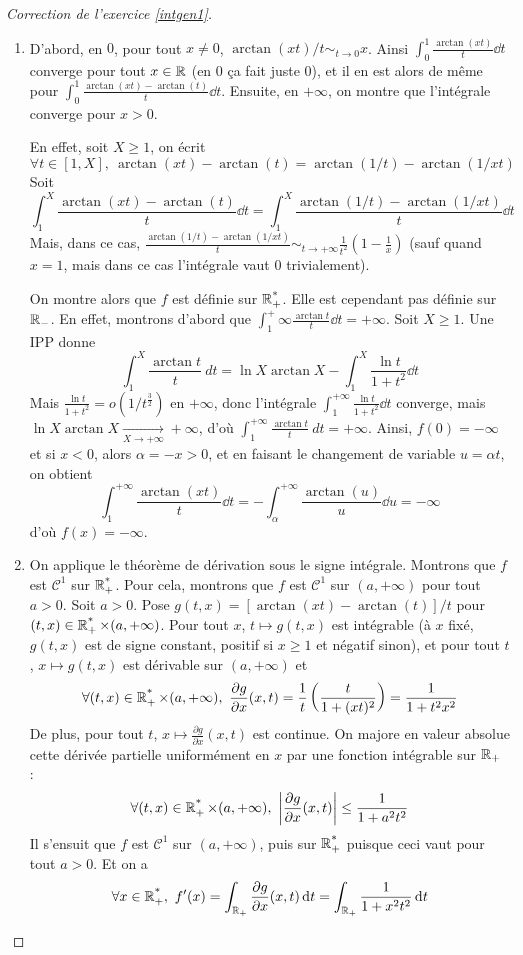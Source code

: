 \begin{proof}[Correction de l'exercice \ref{intgen1}]
	\begin{enumerate}
		\item D'abord, en $0$, pour tout $x\neq 0$, $\arctan(xt)/t\sim_{t\to 0} x$. 
		Ainsi $\int_0^1\frac{\arctan(xt)}t\dd t$ converge pour tout $x\in\operatorname{\mathbb R}$ (en $0$ ça fait juste $0$),
		et il en est alors de même pour $\int_0^1\frac{\arctan(xt)-\arctan(t)}t\dd t$.
		Ensuite, en $+\infty$, on montre que l'intégrale converge pour $x>0$. 
		
		En effet, soit $X\geq 1$, on écrit 
		\[
			\forall t\in[1,X],\ \arctan(xt)-\arctan(t)=\arctan(1/t)-\arctan(1/xt)	
		\]
		Soit 
		\[
			\int_1^X\frac{\arctan(xt)-\arctan(t)}t\dd t=\int_1^X\frac{\arctan(1/t)-\arctan(1/xt)}t \dd t
		\]
		Mais, dans ce cas, $\frac{\arctan(1/t)-\arctan(1/xt)}t\sim_{t\to +\infty}\frac1{t^2}\left(1-\frac1x\right)$ 
		(sauf quand $x=1$, mais dans ce cas l'intégrale vaut $0$ trivialement).

		On montre alors que $f$ est définie sur $\operatorname{\mathbb R_+^*}$. 
		Elle est cependant pas définie sur $\operatorname{\mathbb R}_-$.
		En effet, montrons d'abord que $\int_1^+{\infty}\frac{\arctan t}t\dd t=+\infty$.
		Soit $X\geq 1$. Une IPP donne 
		\[
			\int_1^X\frac{\arctan t}t\ dt =\ln X\arctan X-\int_1^X\frac{\ln t}{1+t^2}\dd t
		\]
		Mais $\frac{\ln t}{1+t^2}=o(1/t^{\frac32})$ en $+\infty$, donc l'intégrale $\int_1^{+\infty}\frac{\ln t}{1+t^2}\dd t$ converge, 
		mais $\ln X\arctan X\xrightarrow[X\to+\infty]{}+\infty$, d'où $\int_1^{+\infty}\frac{\arctan t}t\ dt=+\infty$. 
		Ainsi, $f(0)=-\infty$ et si $x<0$, alors $\alpha=-x>0$, et en faisant le changement de variable $u=\alpha t$, on obtient
		\[
			\int_1^{+\infty}\frac{\arctan(xt)}t\dd t=-\int_\alpha^{+\infty}\frac{\arctan(u)}u\dd u=-\infty
		\]
		d'où $f(x)=-\infty$.

		\item On applique le théorème de dérivation sous le signe intégrale.
		Montrons que $f$ est $\mathcal C^1$ sur $\operatorname{\mathbb R_+^*}$. Pour cela, montrons que $f$ est $\mathcal C^1$
		sur $(a,+\infty)$ pour tout $a>0$.
		Soit $a>0$. Pose $g(t,x)=[\arctan(xt)-\arctan(t)]/t$ pour $(t,x)\in\operatorname{\mathbb R_+^*}\times(a,+\infty)$. 
		Pour tout $x$, $t\mapsto g(t,x)$ est intégrable (à $x$ fixé, $g(t,x)$ est de signe constant, positif si $x\geq 1$ et négatif sinon),
		et pour tout $t$, $x\mapsto g(t,x)$ est dérivable sur $(a,+\infty)$ et 
		\[
			\forall (t,x)\in\Rpe\times(a,+\infty),\ \frac{\partial g}{\partial x}(x,t)=\frac1t\left(\frac{t}{1+(xt)^2}\right)=\frac1{1+t^2x^2}
		\]
		De plus, pour tout $t$, $x\mapsto \frac{\partial g}{\partial x}(x,t)$ est continue. On majore en valeur absolue cette dérivée partielle uniformément en $x$ par une fonction intégrable sur $\operatorname{\mathbb R}_+$ :
		\[
			\forall (t,x)\in\Rpe\times(a,+\infty),\ \left|\frac{\partial g}{\partial x}(x,t)\right|\leq \frac1{1+a^2t^2}
		\]
		Il s'ensuit que $f$ est $\mathcal C^1$ sur $(a,+\infty)$, puis sur $\operatorname{\mathbb R_+^*}$ puisque ceci vaut pour tout $a>0$.
		Et on a 
		\[
			\forall x\in\Rpe,\ f'(x)=\int_{\R_+}\frac{\partial g}{\partial x}(x,t)\dd t=\int_{\R_+}\frac1{1+x^2t^2}\dd t
		\]


\end{enumerate}
\end{proof}
